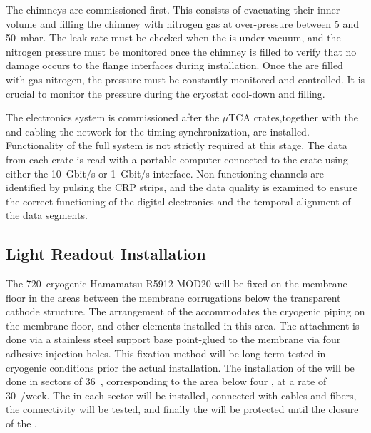The  chimneys are commissioned first. This consists of evacuating their inner volume and filling the chimney with nitrogen gas at over-pressure between 5 and 50~mbar.
The leak rate must be checked when the  is under vacuum, and the nitrogen pressure must be monitored once the chimney is filled to verify that no damage occurs to the flange interfaces during installation.
Once the  are filled with gas nitrogen, the pressure must be constantly monitored and controlled.
It is crucial to monitor the  pressure during the cryostat cool-down and filling.

The electronics system is commissioned after the $\mu$TCA crates,together with the  and cabling the  network for the timing synchronization, are installed.
Functionality of the full  system is not strictly required at this stage.
The data from each crate is read with a portable computer connected to the crate using either the  10~Gbit/s or 1~Gbit/s interface.
Non-functioning channels are identified by pulsing the CRP strips, and the data quality is examined to ensure the correct functioning of the digital electronics and the temporal alignment of the data segments.

\subsection{Light Readout Installation}

The 720~cryogenic Hamamatsu R5912-MOD20  will be fixed on the membrane floor in the areas between the membrane corrugations below the transparent cathode structure.
The arrangement of the  accommodates the cryogenic piping on the membrane floor, and other elements installed in this area.
The attachment is done via a stainless steel support base point-glued to the membrane via four adhesive injection holes.
This fixation method will be long-term tested in cryogenic conditions prior the actual installation.
The installation of the  will be done in sectors of 36~, corresponding to the area below four , at a rate of 30~/week.
The  in each sector will be installed, connected with cables and fibers, the connectivity will be tested, and finally the  will be protected until the closure of the . 

